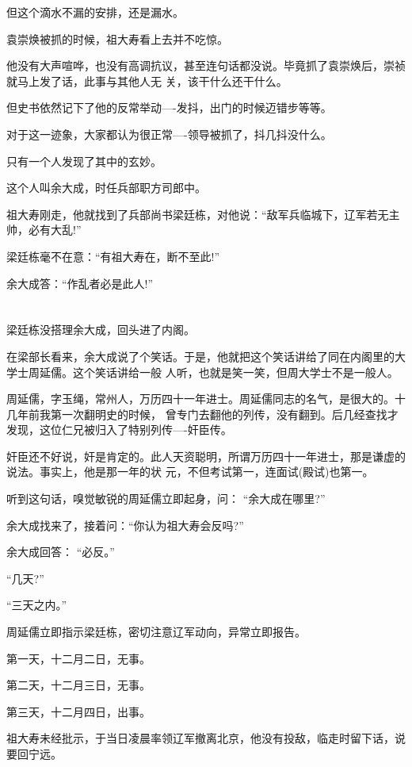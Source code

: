 \documentclass[11pt,a4paper,onecolumn]{article}
\begin{document}
但这个滴水不漏的安排，还是漏水。

袁崇焕被抓的时候，祖大寿看上去并不吃惊。

他没有大声喧哗，也没有高调抗议，甚至连句话都没说。毕竟抓了袁崇焕后，崇祯就马上发了话，此事与其他人无
关，该干什么还干什么。

但史书依然记下了他的反常举动----发抖，出门的时候迈错步等等。

对于这一迹象，大家都认为很正常----领导被抓了，抖几抖没什么。

只有一个人发现了其中的玄妙。

这个人叫余大成，时任兵部职方司郎中。

祖大寿刚走，他就找到了兵部尚书梁廷栋，对他说：``敌军兵临城下，辽军若无主帅，必有大乱!''

梁廷栋毫不在意：``有祖大寿在，断不至此!''

余大成答：``作乱者必是此人!''

\section[\thesection]{}

梁廷栋没搭理余大成，回头进了内阁。

在梁部长看来，余大成说了个笑话。于是，他就把这个笑话讲给了同在内阁里的大学士周延儒。这个笑话讲给一般
人听，也就是笑一笑，但周大学士不是一般人。

周延儒，字玉绳，常州人，万历四十一年进士。周延儒同志的名气，是很大的。十几年前我第一次翻明史的时候，
曾专门去翻他的列传，没有翻到。后几经查找才发现，这位仁兄被归入了特别列传----奸臣传。

奸臣还不好说，奸是肯定的。此人天资聪明，所谓万历四十一年进士，那是谦虚的说法。事实上，他是那一年的状
元，不但考试第一，连面试(殿试)也第一。

听到这句话，嗅觉敏锐的周延儒立即起身，问： ``余大成在哪里?''

余大成找来了，接着问：``你认为祖大寿会反吗?''

余大成回答： ``必反。''

``几天?''

``三天之内。''

周延儒立即指示梁廷栋，密切注意辽军动向，异常立即报告。

第一天，十二月二日，无事。

第二天，十二月三日，无事。

第三天，十二月四日，出事。

祖大寿未经批示，于当日凌晨率领辽军撤离北京，他没有投敌，临走时留下话，说要回宁远。
\end{document}
